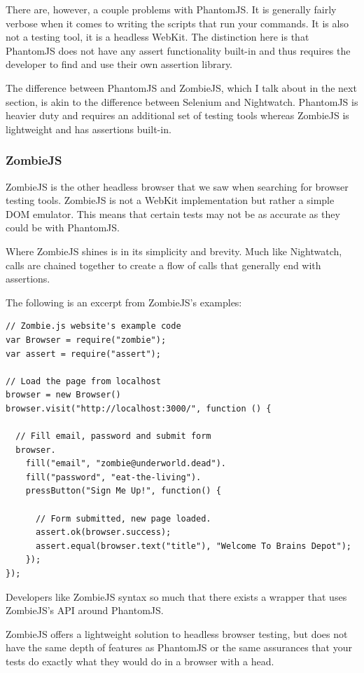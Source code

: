 \documentclass[12pt]{ucthesis}
\begin{document}
There are, however, a couple problems with PhantomJS. It is generally fairly verbose when it comes to writing the scripts that run your commands. It is also not a testing tool, it is a headless WebKit. The distinction here is that PhantomJS does not have any assert functionality built-in and thus requires the developer to find and use their own assertion library.

The difference between PhantomJS and ZombieJS, which I talk about in the next section, is akin to the difference between Selenium and Nightwatch. PhantomJS is heavier duty and requires an additional set of testing tools whereas ZombieJS is lightweight and has assertions built-in.

\subsubsection{ZombieJS}
ZombieJS\cite{ZombieJS} is the other headless browser that we saw when searching for browser testing tools. ZombieJS is not a WebKit implementation but rather a simple DOM emulator. This means that certain tests may not be as accurate as they could be with PhantomJS.

Where ZombieJS shines is in its simplicity and brevity. Much like Nightwatch, calls are chained together to create a flow of calls that generally end with assertions.

The following is an excerpt from ZombieJS's examples:
\begin{lstlisting}
// Zombie.js website's example code
var Browser = require("zombie");
var assert = require("assert");

// Load the page from localhost
browser = new Browser()
browser.visit("http://localhost:3000/", function () {

  // Fill email, password and submit form
  browser.
    fill("email", "zombie@underworld.dead").
    fill("password", "eat-the-living").
    pressButton("Sign Me Up!", function() {

      // Form submitted, new page loaded.
      assert.ok(browser.success);
      assert.equal(browser.text("title"), "Welcome To Brains Depot");
    });
});
\end{lstlisting}

Developers like ZombieJS syntax so much that there exists a wrapper that uses ZombieJS's API around PhantomJS\cite{ZombiePhantom}.

ZombieJS offers a lightweight solution to headless browser testing, but does not have the same depth of features as PhantomJS or the same assurances that your tests do exactly what they would do in a browser with a head.
\end{document}
